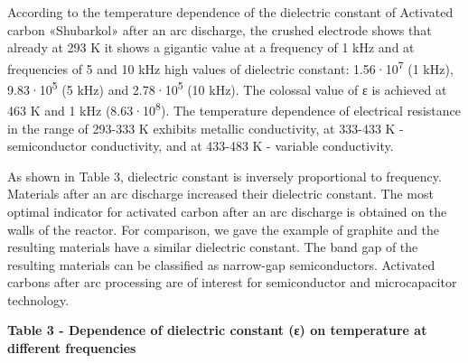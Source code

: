 According to the temperature dependence of the dielectric constant of
Activated carbon «Shubarkol» after an arc discharge, the crushed
electrode shows that already at 293 K it shows a gigantic value at a
frequency of 1 kHz and at frequencies of 5 and 10 kHz high values
\hspace{0pt}\hspace{0pt}of dielectric constant:
1.56·10\textsuperscript{7} (1 kHz), 9.83·10\textsuperscript{5} (5 kHz)
and 2.78·10\textsuperscript{5} (10 kHz). The colossal value of ε is
achieved at 463 K and 1 kHz (8.63·10\textsuperscript{8}). The
temperature dependence of electrical resistance in the range of 293-333
K exhibits metallic conductivity, at 333-433 K - semiconductor
conductivity, and at 433-483 K - variable conductivity.

As shown in Table 3, dielectric constant is inversely proportional to
frequency. Materials after an arc discharge increased their dielectric
constant. The most optimal indicator for activated carbon after an arc
discharge is obtained on the walls of the reactor. For comparison, we
gave the example of graphite and the resulting materials have a similar
dielectric constant. The band gap of the resulting materials can be
classified as narrow-gap semiconductors. Activated carbons after arc
processing are of interest for semiconductor and microcapacitor
technology.

{\bfseries Table 3 - Dependence of dielectric constant (ε) on temperature
at different frequencies}

